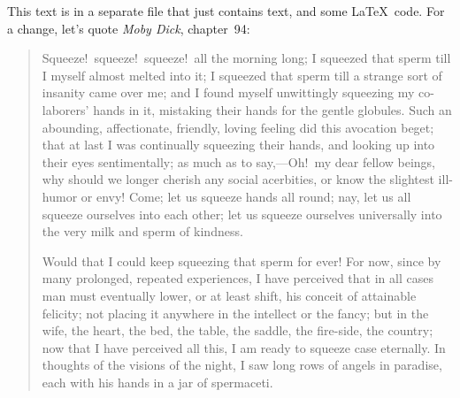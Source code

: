 
This text is in a separate file that just contains text, and some \LaTeX\ code.
For a change, let's quote \emph{Moby Dick}, chapter~94:
\begin{quotation} %
  Squeeze!\ squeeze!\ squeeze!\ all the morning long; I squeezed that sperm
  till I myself almost melted into it; I squeezed that sperm till a strange
  sort of insanity came over me; and I found myself unwittingly squeezing my
  co-laborers' hands in it, mistaking their hands for the gentle globules.
  Such an abounding, affectionate, friendly, loving feeling did this avocation
  beget; that at last I was continually squeezing their hands, and looking up
  into their eyes sentimentally; as much as to say,---Oh!\ my dear fellow
  beings, why should we longer cherish any social acerbities, or know the
  slightest ill-humor or envy!  Come; let us squeeze hands all round; nay, let
  us all squeeze ourselves into each other; let us squeeze ourselves
  universally into the very milk and sperm of kindness.

  Would that I could keep squeezing that sperm for ever! For now, since by many
  prolonged, repeated experiences, I have perceived that in all cases man must
  eventually lower, or at least shift, his conceit of attainable felicity; not
  placing it anywhere in the intellect or the fancy; but in the wife, the
  heart, the bed, the table, the saddle, the fire-side, the country; now that I
  have perceived all this, I am ready to squeeze case eternally.  In thoughts
  of the visions of the night, I saw long rows of angels in paradise, each with
  his hands in a jar of spermaceti.
\end{quotation}
